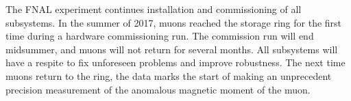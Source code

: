 The FNAL \mugmtwo experiment continues installation and commissioning of all subsystems.  In the summer of 2017, muons reached the storage ring for the first time during a hardware commissioning run.  The commission run will end midsummer, and muons will not return for several months.  All subsystems will have a respite to fix unforeseen problems and improve robustness.  The next time muons return to the \mugmtwo ring, the data marks the start of making an unprecedent precision measurement of the anomalous magnetic moment of the muon.







